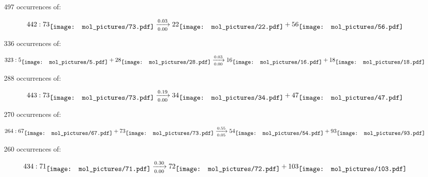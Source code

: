 \documentclass{article}
\begin{document}
\vspace{1cm}


497 occurrences of:

$$
442:  
73
\raisebox{-.5\height}{\texttt{[image: mol\_pictures/73.pdf]}}
\xrightarrow[0.00]{0.03}
22
\raisebox{-.5\height}{\texttt{[image: mol\_pictures/22.pdf]}}
+
56
\raisebox{-.5\height}{\texttt{[image: mol\_pictures/56.pdf]}}
$$



\vspace{1cm}


336 occurrences of:

$$
323:  
5
\raisebox{-.5\height}{\texttt{[image: mol\_pictures/5.pdf]}}
+
28
\raisebox{-.5\height}{\texttt{[image: mol\_pictures/28.pdf]}}
\xrightarrow[0.00]{0.03}
16
\raisebox{-.5\height}{\texttt{[image: mol\_pictures/16.pdf]}}
+
18
\raisebox{-.5\height}{\texttt{[image: mol\_pictures/18.pdf]}}
$$



\vspace{1cm}


288 occurrences of:

$$
443:  
73
\raisebox{-.5\height}{\texttt{[image: mol\_pictures/73.pdf]}}
\xrightarrow[0.00]{0.19}
34
\raisebox{-.5\height}{\texttt{[image: mol\_pictures/34.pdf]}}
+
47
\raisebox{-.5\height}{\texttt{[image: mol\_pictures/47.pdf]}}
$$



\vspace{1cm}


270 occurrences of:

$$
264:  
67
\raisebox{-.5\height}{\texttt{[image: mol\_pictures/67.pdf]}}
+
73
\raisebox{-.5\height}{\texttt{[image: mol\_pictures/73.pdf]}}
\xrightarrow[0.05]{0.55}
54
\raisebox{-.5\height}{\texttt{[image: mol\_pictures/54.pdf]}}
+
93
\raisebox{-.5\height}{\texttt{[image: mol\_pictures/93.pdf]}}
$$



\vspace{1cm}


260 occurrences of:

$$
434:  
71
\raisebox{-.5\height}{\texttt{[image: mol\_pictures/71.pdf]}}
\xrightarrow[0.00]{0.30}
72
\raisebox{-.5\height}{\texttt{[image: mol\_pictures/72.pdf]}}
+
103
\raisebox{-.5\height}{\texttt{[image: mol\_pictures/103.pdf]}}
$$
\end{document}
